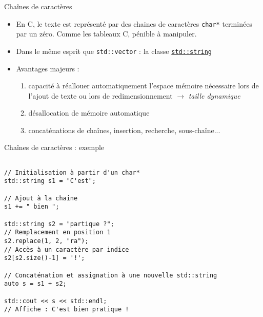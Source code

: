 \documentclass[c]{beamer}
\newcommand{\inline}[1]{\texttt{#1}}
\begin{document}

\begin{frame}[fragile]{Chaînes de caractères}
\begin{itemize}
\item En C, le texte est représenté par des chaines de caractères \inline{char*} terminées par un zéro. Comme les tableaux C, pénible à manipuler.

\item Dans le même esprit que \inline{std::vector} : la classe \href{https://en.cppreference.com/w/cpp/string}{\inline{std::string}}

\item Avantages majeurs :

\begin{enumerate}
\item capacité à réallouer automatiquement l'espace mémoire nécessaire lors de l'ajout de texte ou lors de redimensionnement $\rightarrow$ \emph{taille dynamique}

\item désallocation de mémoire automatique

\item concaténations de chaînes, insertion, recherche, sous-chaîne...
\end{enumerate}
\end{itemize}
\end{frame}


\begin{frame}[fragile]{Chaînes de caractères : exemple}

\begin{verbatim}

// Initialisation à partir d'un char*
std::string s1 = "C'est";

// Ajout à la chaine
s1 += " bien ";

std::string s2 = "partique ?";
// Remplacement en position 1
s2.replace(1, 2, "ra");
// Accès à un caractère par indice
s2[s2.size()-1] = '!';

// Concaténation et assignation à une nouvelle std::string
auto s = s1 + s2;

std::cout << s << std::endl;
// Affiche : C'est bien pratique !

\end{verbatim}

\end{frame}
\end{document}
